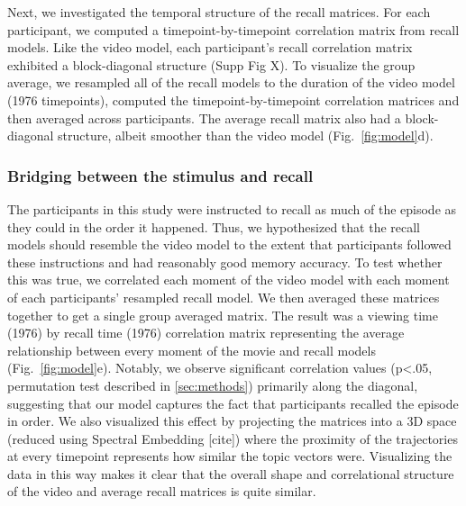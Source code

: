 \documentclass{article}
\begin{document}
{Next, we investigated the temporal structure of the recall matrices. For each participant, we computed a timepoint-by-timepoint correlation matrix from recall models. Like the video model, each participant's recall correlation matrix exhibited a block-diagonal structure (Supp Fig X). To visualize the group average, we resampled all of the recall models to the duration of the video model (1976 timepoints), computed the timepoint-by-timepoint correlation matrices and then averaged across participants.  The average recall matrix also had a block-diagonal structure, albeit smoother than the video model (Fig.~\ref{fig:model}d).

\subsubsection{Bridging between the stimulus and recall}
The participants in this study were instructed to recall as much of the episode as they could in the order it happened.  Thus, we hypothesized that the recall models should resemble the video model to the extent that participants followed these instructions and had reasonably good memory accuracy. To test whether this was true, we correlated each moment of the video model with each moment of each participants' resampled recall model. We then averaged these matrices together to get a single group averaged matrix.  The result was a viewing time (1976) by recall time (1976) correlation matrix representing the average relationship between every moment of the movie and recall models (Fig.~\ref{fig:model}e). Notably, we observe significant correlation values (p<.05, permutation test described in \ref{sec:methods}) primarily along the diagonal, suggesting that our model captures the fact that participants recalled the episode in order. We also visualized this effect by projecting the matrices into a 3D space (reduced using Spectral Embedding [cite]) where the proximity of the trajectories at every timepoint represents how similar the topic vectors were. Visualizing the data in this way makes it clear that the overall shape and correlational structure of the video and average recall matrices is quite similar.

}
\end{document}
